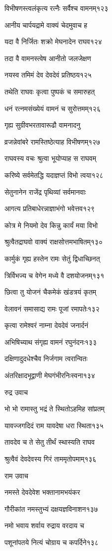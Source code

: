 विभीषणस्त्वलंकृत्य रत्नैः सर्वैश्च वामनम्१२३

आनीय चार्पयद्रामे वाक्यं चेदमुवाच ह

यदा वै निर्जितः शक्रो मेघनादेन राघव१२४

तदा वै वामनस्त्वेष आनीतो जलजेक्षण

नयस्व तमिमं देव देवदेवं प्रतिष्ठय१२५

तथेति राघवः कृत्वा पुष्पकं च समारुहत्

धनं रत्नमसंख्येयं वामनं च सुरोत्तमम्१२६

गृह्य सुग्रीवभरतावारूढौ वामनादनु

व्रजन्नेवांबरे रामस्तिष्ठेत्याह विभीषणम्१२७

राघवस्य वचः श्रुत्वा भूयोप्याह स राघवम्

करिष्ये सर्वमेतद्धि यदाज्ञप्तं विभो त्वया१२८

सेतुनानेन राजेंद्र पृथिव्यां सर्वमानवाः

आगत्य प्रतिबाधेरन्नाज्ञाभंगो भवेत्तव१२९

कोत्र मे नियमो देव किन्नु कार्यं मया विभो

श्रुत्वैतद्राघवो वाक्यं राक्षसोत्तमभाषितम्१३०

कार्मुकं गृह्य हस्तेन रामः सेतुं द्विधाच्छिनत्

त्रिर्विभज्य च वेगेन मध्ये वै दशयोजनम्१३१

छित्वा तु योजनं चैकमेकं खंडत्रयं कृतम्

वेलावनं समासाद्य रामः पूजां रमापतेः१३२

कृत्वा रामेश्वरं नाम्ना देवदेवं जनार्दनं

अभिषिच्याथ संगृह्य वामनं रघुनंदनः१३३

दक्षिणादुदधेश्चैव निर्जगाम त्वरान्वितः

अंतरिक्षादभूद्वाणी मेघगंभीरनिःस्वना१३४

रुद्र उवाच

भो भो रामास्तु भद्रं ते स्थितोऽहमिह सांप्रतम्

यावज्जगदिदं राम यावदेषा धरा स्थिता१३५

तावदेव च ते सेतु तीर्थं स्थास्यति राघव

श्रुत्वैवं देवदेवस्य गिरं ताममृतोपमाम्१३६

राम उवाच

नमस्ते देवदेवेश भक्तानामभयंकर

गौरीकांत नमस्तुभ्यं दक्षयज्ञविनाशन१३७

नमो भवाय शर्वाय रुद्राय वरदाय च

पशूनांपतये नित्यं चोग्राय च कपर्दिने१३८

